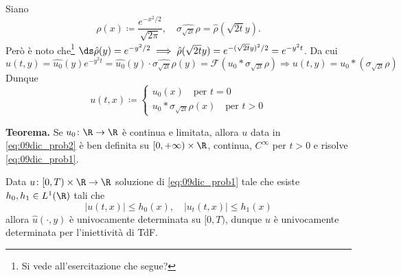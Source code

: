Siano 
%
$$
	\rho(x) \coloneqq \frac{e^{-x^2 / 2}}{\sqrt{2\pi}}, \quad  \hat{\sigma_{\sqrt{2t}}\rho} = \hat{\rho}(\sqrt{2t}y).
$$
%
Però è noto che\footnote{Si vede all'esercitazione che segue?} $\ds \hat{\rho}(y) = e^{-y^2/2} \implies \hat{\rho}(\sqrt{2t}y) = e^{-(\sqrt{2t}y)^2 / 2} = e^{-y^2 t}$. Da cui
%
$$
	\hat{u}(t,y) = \hat{u_0} (y) e^{-y^2t} = \hat{u_0}(y) \cdot \hat{\sigma_{\sqrt{2t}} \rho}(y)
	= \mathcal{F}(u_0 \ast \sigma_{\sqrt{2t}} \rho)
	\Longrightarrow u(t,y) = u_0 \ast \left( \sigma_{\sqrt{2t}} \rho \right)
$$
%
Dunque
%
\begin{equation}
\label{eq:09dic_prob2} \tag{$\ast$}
	u(t,x) \coloneqq 
	\begin{cases}
		u_0(x) \quad \text{per } t=0 \\
		u_0 \ast \sigma_{\sqrt{2t}} \rho(x) \quad \text{per } t > 0
	\end{cases} 
\end{equation}

\textbf{Teorema.} Se $u_0 \colon \R \to \R$ è continua e limitata, allora $u$ data in \eqref{eq:09dic_prob2} è ben definita su $[0,+\infty) \times \R$, continua, $C^\infty$ per $t>0$ e risolve \eqref{eq:09dic_prob1}.

\vss

Data $u \colon [0,T) \times \R \to \R$ soluzione di \eqref{eq:09dic_prob1} tale che esiste $h_0,h_1 \in L^1(\R)$ tali che 
%
$$
	|u(t,x)| \leq h_0(x), \quad |u_t(t,x)| \leq h_1(x)
$$
%
allora $\hat{u}(\cdot,y)$ è univocamente determinata su $[0,T)$, dunque $u$ è univocamente determinata per l'iniettività di TdF.

